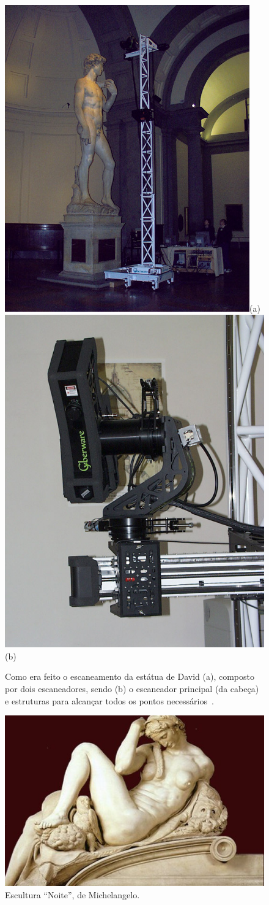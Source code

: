 \begin{figure}[!h]
	\centering
	\includegraphics[width=0.45\linewidth]{figs/gantry-and-david4-s.jpg}(a)
	\includegraphics[width=0.45\linewidth]{figs/mgantry-scannerhead-s.jpg}(b)
	\caption{%
	Como era feito o escaneamento da estátua de David (a), composto por dois escaneadores, sendo (b) o escaneador principal (da cabeça) e estruturas para alcançar todos os pontos necessários~\cite{levoy2000digital}.
	}\label{fig:cabecaScanner}
\end{figure}

\begin{figure}[!h]
	\centering
	\includegraphics[width=0.4\linewidth]{figs/michelangelo-notte.jpg}
	\caption{%
	Escultura ``Noite'', de Michelangelo.
	}\label{fig:noite}
\end{figure}

